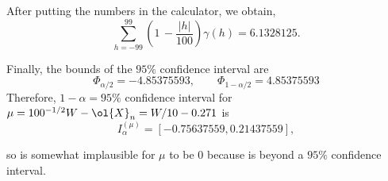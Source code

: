After putting the numbers in the calculator, we obtain,
\[ \sum_{h = -99}^{99}\left(1\,-\frac{|h|}{100}\right)\gamma(h) = 6.1328125. \]

Finally, the bounds of the $95\%$ confidence interval are
\[ \Phi_{\alpha/2} = -4.85375593,\hspace{2em} \Phi_{1-\alpha/2} = 4.85375593 \]
Therefore, $1-\alpha = 95\%$ confidence interval for $\mu = 100^{-1/2} W - \ol{X}_n = W/10 - 0.271$ is
\[ I_{\alpha}^{(\mu)} = [-0.75637559, 0.21437559], \]

so is somewhat implausible for $\mu$ to be 0 because is beyond a $95\%$ confidence interval.